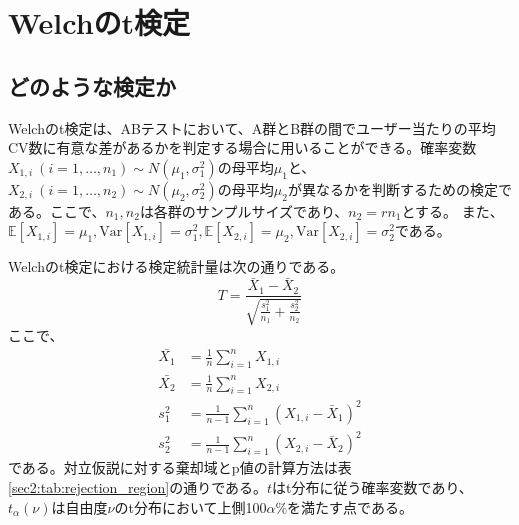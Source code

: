 \section{Welchのt検定}

\subsection{どのような検定か}

Welchのt検定は、ABテストにおいて、A群とB群の間でユーザー当たりの平均CV数に有意な差があるかを判定する場合に用いることができる。確率変数$X_{1,i}\ (i=1,\ldots,n_{1}) \sim N(\mu_{1}, \sigma_{1}^{2})$の母平均$\mu_{1}$と、$X_{2, i}\ (i=1,\ldots,n_{2}) \sim N(\mu_{2}, \sigma_{2}^{2})$の母平均$\mu_{2}$が異なるかを判断するための検定である。ここで、$n_{1},n_{2}$は各群のサンプルサイズであり、$n_{2}=rn_{1}$とする。
また、$\mathbb{E}[X_{1,i}]=\mu_{1}, \text{Var}[X_{1,i}]=\sigma_{1}^{2}, \mathbb{E}[X_{2,i}]=\mu_{2}, \text{Var}[X_{2,i}]=\sigma_{2}^{2}$である。

Welchのt検定における検定統計量は次の通りである。
\begin{equation}
    T = \frac{\bar{X}_1 - \bar{X}_2}{\sqrt{\frac{s_{1}^{2}}{n_{1}} + \frac{s_{2}^{2}}{n_{2}}}}
\end{equation}
ここで、
\begin{align}
    \bar{X_{1}} & = \frac{1}{n} \sum_{i = 1}^{n} X_{1, i}                         \\
    \bar{X_{2}} & = \frac{1}{n} \sum_{i = 1}^{n} X_{2, i}                         \\
    s_{1}^{2}   & = \frac{1}{n - 1} \sum_{i = 1}^{n} (X_{1, i} - \bar{X}_{1})^{2} \\
    s_{2}^{2}   & = \frac{1}{n - 1} \sum_{i = 1}^{n} (X_{2, i} - \bar{X}_{2})^{2}
\end{align}
である。対立仮説に対する棄却域とp値の計算方法は表\ref{sec2:tab:rejection_region}の通りである。$t$はt分布に従う確率変数であり、$t_{\alpha}(\nu)$は自由度$\nu$のt分布において上側100$\alpha$\%を満たす点である。

\begin{table}[h]
    \centering
    \caption{t検定における対立仮説と棄却域、p値の計算方法}
    \label{sec2:tab:rejection_region}
    \begin{center}
        \renewcommand{\arraystretch}{0.9} %
        \setlength{\tabcolsep}{8pt}      %
    \end{center}
\end{table}

